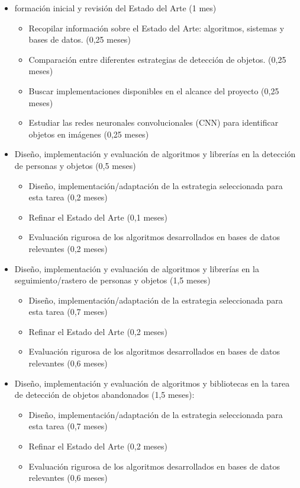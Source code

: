 \begin{itemize}
\item formación inicial y revisión del Estado del Arte (1 mes)
  
  \begin{itemize}
    \item Recopilar información sobre el Estado del Arte: algoritmos, sistemas y bases de datos. (0,25 meses)
    \item Comparación entre diferentes estrategias de detección de objetos. (0,25 meses)
    \item Buscar implementaciones disponibles en el alcance del proyecto (0,25 meses)
    \item Estudiar las redes neuronales convolucionales (CNN) para identificar objetos en imágenes (0,25 meses)
  \end{itemize}
  
\item Diseño, implementación y evaluación de algoritmos y librerías en la detección de personas y objetos (0,5 meses)
  
  \begin{itemize}
  \item Diseño, implementación/adaptación de la estrategia seleccionada para esta tarea (0,2 meses)
  \item Refinar el Estado del Arte (0,1 meses)
  \item Evaluación rigurosa de los algoritmos desarrollados en bases de datos relevantes (0,2 meses)
  \end{itemize}
  
\item Diseño, implementación y evaluación de algoritmos y librerías en la seguimiento/rastero de personas y objetos (1,5 meses)
  
  \begin{itemize}
  \item Diseño, implementación/adaptación de la estrategia seleccionada para esta tarea (0,7 meses)
  \item Refinar el Estado del Arte (0,2 meses)
  \item Evaluación rigurosa de los algoritmos desarrollados en bases de datos relevantes (0,6 meses)
  \end{itemize}

\item Diseño, implementación y evaluación de algoritmos y bibliotecas en la tarea de detección de objetos abandonados (1,5 meses):
  
  \begin{itemize}
  \item Diseño, implementación/adaptación de la estrategia seleccionada para esta tarea (0,7 meses)
  \item Refinar el Estado del Arte (0,2 meses)
  \item Evaluación rigurosa de los algoritmos desarrollados en bases de datos relevantes (0,6 meses)
    \end{itemize}
    

\end{itemize}
